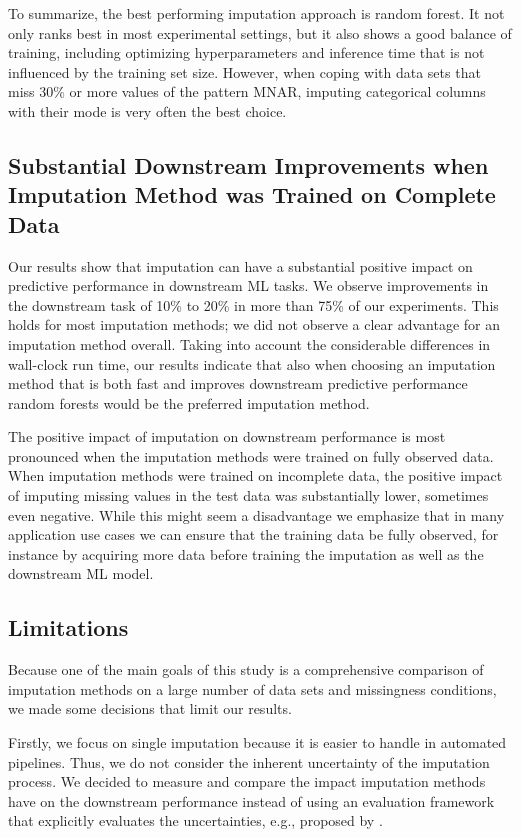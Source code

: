 \documentclass[utf8]{frontiersSCNS} %
\begin{document}
To summarize, the best performing imputation approach is random forest. It not only ranks best in most experimental settings, but it also shows a good balance of training, including optimizing hyperparameters and inference time that is not influenced by the training set size. However, when coping with data sets that miss $30\%$ or more values of the pattern MNAR, imputing categorical columns with their mode is very often the best choice.


\subsection{Substantial Downstream Improvements when Imputation Method was Trained on Complete Data}
%
Our results show that imputation can have a substantial positive impact on predictive performance in downstream ML tasks. We observe improvements in the downstream task of 10\% to 20\% in more than 75\% of our experiments. This holds for most imputation methods; we did not observe a clear advantage for an imputation method overall. Taking into account the considerable differences in wall-clock run time, our results indicate that also when choosing an imputation method that is both fast and improves downstream predictive performance random forests would be the preferred imputation method.

The positive impact of imputation on downstream performance is most pronounced when the imputation methods were trained on fully observed data. When imputation methods were trained on incomplete data, the positive impact of imputing missing values in the test data was substantially lower, sometimes even negative. While this might seem a disadvantage we emphasize that in many application use cases we can ensure that the training data be fully observed, for instance by acquiring more data before training the imputation as well as the downstream ML model.


\subsection{Limitations}
\label{sec:limitations}
%
Because one of the main goals of this study is a comprehensive comparison of imputation methods on a large number of data sets and missingness conditions, we made some decisions that limit our results.

Firstly, we focus on single imputation because it is easier to handle in automated pipelines. Thus, we do not consider the inherent uncertainty of the imputation process. We decided to measure and compare the impact imputation methods have on the downstream performance instead of using an evaluation framework that explicitly evaluates the uncertainties, e.g., proposed by \cite{limitations}.
\end{document}
